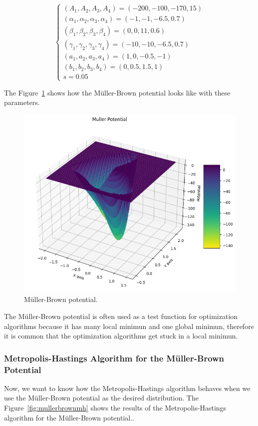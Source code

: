 \documentclass{report}
\begin{document}
\[
	\begin{cases}
		(A_1, A_2, A_3, A_4) = (-200, -100, -170, 15) \\
		(\alpha_1, \alpha_2, \alpha_3, \alpha_4) = (-1, -1, -6.5, 0.7) \\
		(\beta_1, \beta_2, \beta_3, \beta_4) = (0, 0, 11, 0.6) \\
		(\gamma_1, \gamma_2, \gamma_3, \gamma_4) = (-10, -10, -6.5, 0.7) \\
		(a_1, a_2, a_3, a_4) = (1, 0, -0.5, -1) \\
		(b_1, b_2, b_3, b_4) = (0, 0.5, 1.5, 1) \\
		s = 0.05
	\end{cases}
\]

The Figure~\ref{fig:mullerbrown} shows how the Müller-Brown potential looks like with these parameters.

\begin{figure}[H]
	\centering
	\includegraphics[width=0.5\linewidth]{./Figures/MCMC/mullerbrown.png}
	\caption{Müller-Brown potential.}
	\label{fig:mullerbrown}
\end{figure}

The Müller-Brown potential is often used as a test function for optimization algorithms because it has many local minimun and one global minimun, therefore it is common that the optimization algorithms get stuck in a local minimun.

\subsubsection{Metropolis-Hastings Algorithm for the Müller-Brown Potential}
\label{sec:metropolis_muller_brown}

Now, we want to know how the Metropolis-Hastings algorithm behaves when we use the Müller-Brown potential as the desired distribution. The Figure~\ref{fig:mullerbrownmh} shows the results of the Metropolis-Hastings algorithm for the Müller-Brown potential..
\end{document}
